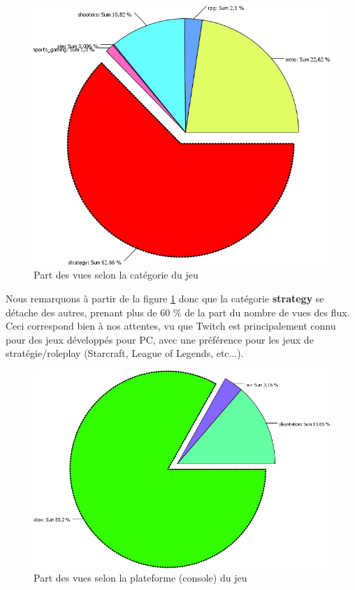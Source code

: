 \documentclass[11pt, a4paper, titlepage]{scrartcl}
\begin{document}
\begin{figure}[h]
    \centering
    \includegraphics[width=\textwidth]{images/main_categories}
    \caption{Part des vues selon la catégorie du jeu}
    \label{fig:main_categories}
\end{figure}

Nous remarquons à partir de la figure \ref{fig:main_categories} donc que la
catégorie \textbf{strategy} se détache des autres, prenant plus de 60 \% de la
part du nombre de vues des flux. Ceci correspond bien à nos attentes, vu que
Twitch est principalement connu pour des jeux développés pour PC, avec une
préférence pour les jeux de stratégie/roleplay (Starcraft, League of Legends,
etc...).

\begin{figure}[h]
    \centering
    \includegraphics[width=\textwidth]{images/main_consoles}
    \caption{Part des vues selon la plateforme (console) du jeu}
    \label{fig:main_consoles}
\end{figure}
\end{document}
